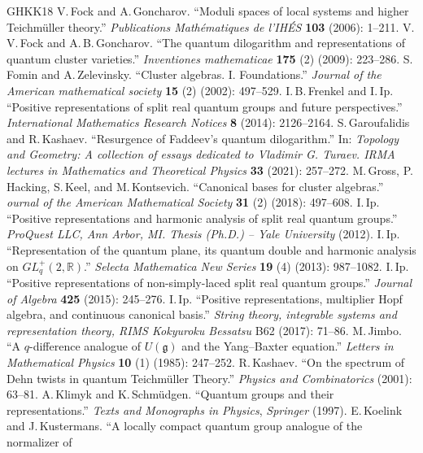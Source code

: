 \documentclass[11pt, reqno]{amsart}
\theoremstyle{definition}
\numberwithin{equation}{section}
\def\R{\mathbb R}
\begin{document}
\begin{thebibliography}{GHKK18}
 V.\,Fock and A.\,Goncharov.
``Moduli spaces of local systems and higher Teichm\"uller theory.''
\emph{Publications Math\'ematiques de l'IH\'ES} \textbf{103} (2006): 1--211.
 V.\,V.\,Fock and A.\,B.\,Goncharov. ``The quantum dilogarithm and representations of
quantum cluster varieties.'' \emph{ Inventiones mathematicae} \textbf{175} (2) (2009): 223--286.
 S.\,Fomin and A.\,Zelevinsky. ``Cluster algebras. I. Foundations.'' \emph{Journal of the American mathematical society} \textbf{15} (2) (2002): 497--529.
 I.\,B.\,Frenkel and I.\,Ip. ``Positive representations of split real quantum groups and future perspectives.''
\emph{International Mathematics Research Notices} \textbf{8} (2014): 2126--2164. 
 S.\,Garoufalidis and R.\,Kashaev. ``Resurgence of Faddeev’s quantum dilogarithm.'' In: \emph{Topology and Geometry: A collection of essays dedicated to Vladimir G. Turaev. IRMA lectures in Mathematics and Theoretical Physics} \textbf{33} (2021): 257--272.
 M.\,Gross, P.\,Hacking, S.\,Keel, and M.\,Kontsevich. ``Canonical bases for cluster algebras.'' \emph{ournal of the American Mathematical Society} \textbf{31} (2) (2018): 497--608.
 I.\,Ip. ``Positive representations and harmonic analysis of split real quantum groups.'' \emph{ProQuest LLC, Ann Arbor, MI. Thesis (Ph.D.) -- Yale University} (2012).
 I.\,Ip. ``Representation of the quantum plane, its quantum double and harmonic analysis on $GL_q^+(2,\R)$.'' \emph{Selecta Mathematica New Series} \textbf{19} (4) (2013): 987--1082.
 I.\,Ip. ``Positive representations of non-simply-laced split real quantum groups.'' \emph{Journal of Algebra} \textbf{425} (2015): 245--276. 
 I.\,Ip. ``Positive representations, multiplier Hopf algebra, and continuous canonical basis.'' \emph{String theory, integrable systems and representation theory, RIMS Kokyuroku Bessatsu} B62 (2017): 71--86.
 M.\,Jimbo. ``A $q$-difference analogue of $U(\mathfrak{g})$ and the Yang--Baxter equation.'' \emph{Letters in Mathematical Physics} \textbf{10} (1) (1985): 247--252.
 R.\,Kashaev. ``On the spectrum of Dehn twists in quantum Teichm\"{u}ller Theory.'' \emph{Physics and Combinatorics} (2001): 63--81.
 A.\,Klimyk and K.\,Schm\"{u}dgen. ``Quantum groups and their representations.'' \emph{Texts and Monographs in Physics}, \emph{Springer} (1997).
 E.\,Koelink and J.\,Kustermans. ``A locally compact quantum group analogue of the normalizer of

\end{thebibliography}
\end{document}

